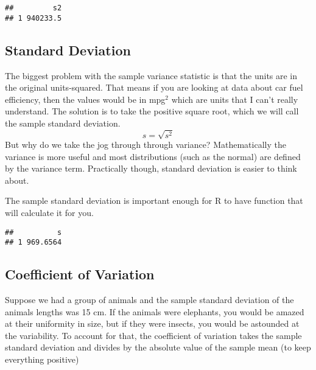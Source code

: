 \documentclass[]{book}
\newenvironment{Shaded}{\begin{snugshade}}{\end{snugshade}}
\newcommand{\KeywordTok}[1]{\textcolor[rgb]{0.13,0.29,0.53}{\textbf{{#1}}}}
\newcommand{\DataTypeTok}[1]{\textcolor[rgb]{0.13,0.29,0.53}{{#1}}}
\newcommand{\StringTok}[1]{\textcolor[rgb]{0.31,0.60,0.02}{{#1}}}
\newcommand{\CommentTok}[1]{\textcolor[rgb]{0.56,0.35,0.01}{\textit{{#1}}}}
\newcommand{\NormalTok}[1]{{#1}}
\begin{document}
\begin{Shaded}
\end{Shaded}

\begin{verbatim}
##         s2
## 1 940233.5
\end{verbatim}

\subsection{Standard Deviation}\label{standard-deviation}

The biggest problem with the sample variance statistic is that the units
are in the original units-squared. That means if you are looking at data
about car fuel efficiency, then the values would be in mpg\(^{2}\) which
are units that I can't really understand. The solution is to take the
positive square root, which we will call the sample standard deviation.
\[s=\sqrt{s^{2}}\] But why do we take the jog through through variance?
Mathematically the variance is more useful and most distributions (such
as the normal) are defined by the variance term. Practically though,
standard deviation is easier to think about.

The sample standard deviation is important enough for R to have function
that will calculate it for you.

\begin{Shaded}
\end{Shaded}

\begin{verbatim}
##          s
## 1 969.6564
\end{verbatim}

\subsection{Coefficient of Variation}\label{coefficient-of-variation}

Suppose we had a group of animals and the sample standard deviation of
the animals lengths was 15 cm. If the animals were elephants, you would
be amazed at their uniformity in size, but if they were insects, you
would be astounded at the variability. To account for that, the
coefficient of variation takes the sample standard deviation and divides
by the absolute value of the sample mean (to keep everything positive)
\end{document}
